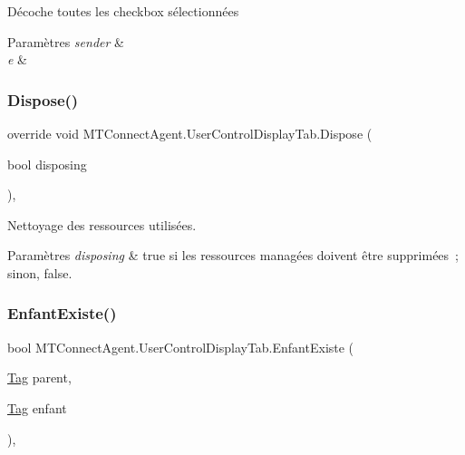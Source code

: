 Décoche toutes les checkbox sélectionnées 


\begin{DoxyParams}{Paramètres}
{\em sender} & \\
\hline
{\em e} & \\
\hline
\end{DoxyParams}
\mbox{\label{class_m_t_connect_agent_1_1_user_control_display_tab_a0cfe1921bf9282de4c87b7b3c68bf6e6}} 
\subsubsection{\texorpdfstring{Dispose()}{Dispose()}}
{\footnotesize\ttfamily override void M\+T\+Connect\+Agent.\+User\+Control\+Display\+Tab.\+Dispose (\begin{DoxyParamCaption}\item[{bool}]{disposing }\end{DoxyParamCaption})\hspace{0.3cm}{\ttfamily [inline]}, {\ttfamily [protected]}}



Nettoyage des ressources utilisées. 


\begin{DoxyParams}{Paramètres}
{\em disposing} & true si les ressources managées doivent être supprimées ; sinon, false.\\
\hline
\end{DoxyParams}
\mbox{\label{class_m_t_connect_agent_1_1_user_control_display_tab_ae8831a67e98923b77b22df4e35842a17}} 
\subsubsection{\texorpdfstring{Enfant\+Existe()}{EnfantExiste()}}
{\footnotesize\ttfamily bool M\+T\+Connect\+Agent.\+User\+Control\+Display\+Tab.\+Enfant\+Existe (\begin{DoxyParamCaption}\item[{\mbox{\hyperlink{class_m_t_connect_agent_1_1_model_1_1_tag}{Tag}}}]{parent,  }\item[{\mbox{\hyperlink{class_m_t_connect_agent_1_1_model_1_1_tag}{Tag}}}]{enfant }\end{DoxyParamCaption})\hspace{0.3cm}{\ttfamily [inline]}, {\ttfamily [private]}}



